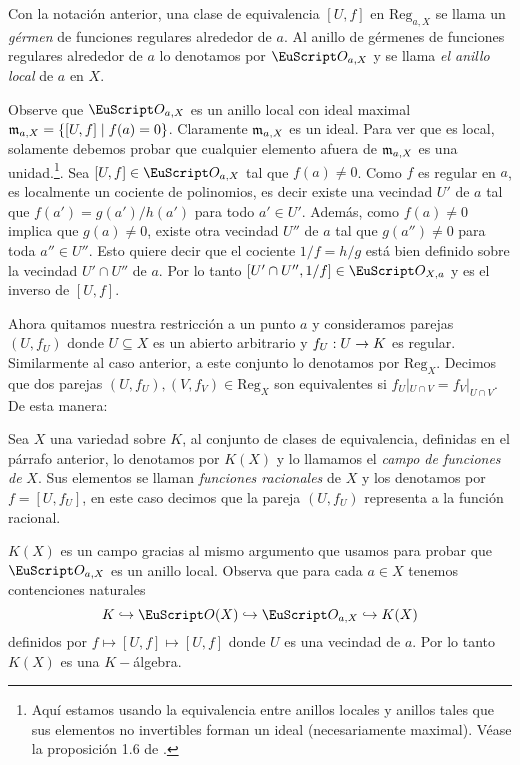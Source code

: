 \documentclass[../../tesis_maestria]{subfiles}
\begin{document}
\begin{defin}
Con la notación anterior, una clase de equivalencia $[U,f]$ en $\mathrm{Reg}_{a,X}$ se llama un \emph{gérmen} de funciones regulares alrededor de $a$. Al anillo de gérmenes de funciones regulares alrededor de $a$ lo denotamos por $\Oo_{a,X}$ y se llama \emph{el anillo local} de $a$ en $X$.
\end{defin}

\begin{nota}
Observe que $\Oo_{a,X}$ es un anillo local con ideal maximal $\mathfrak{m}_{a,X}=\{[U,f]\mid f(a)= 0\}$. Claramente $\mathfrak{m}_{a,X}$ es un ideal. Para ver que es local, solamente debemos probar que cualquier elemento afuera de $\mathfrak{m}_{a,X}$ es una unidad.\footnote{Aquí estamos usando la equivalencia entre anillos locales y anillos tales que sus elementos no invertibles forman un ideal (necesariamente maximal). Véase la proposición 1.6 de \cite{AtiyahITCA}.}. Sea $[U,f]\in\Oo_{a,X}$ tal que $f(a)\neq0$. Como $f$ es regular en $a$, es localmente un cociente de polinomios, es decir existe una vecindad $U'$ de $a$ tal que $f(a')=g(a')/h(a')$ para todo $a'\in U'$. Además, como $f(a)\neq 0$ implica que $g(a)\neq 0$, existe otra vecindad $U''$ de $a$ tal que $g(a'')\neq 0$ para toda $a''\in U''$. Esto quiere decir que el cociente $1/f=h/g$ está bien definido sobre la vecindad $U'\cap U''$ de $a$. Por lo tanto $[U'\cap U'',1/f]\in\Oo_{X,a}$ y es el inverso de $[U,f]$. 
\end{nota}

Ahora quitamos nuestra restricción a un punto $a$ y consideramos parejas $(U,f_U)$ donde $U\subseteq X$ es un abierto arbitrario y $f_U:U\rightarrow K$ es regular. Similarmente al caso anterior, a este conjunto lo denotamos por $\mathrm{Reg}_X$. Decimos que dos parejas $(U,f_U),(V,f_V)\in\mathrm{Reg}_X$ son equivalentes si $f_U|_{U\cap V}=f_V|_{U\cap V}$. De esta manera:

\begin{defin}
Sea $X$ una variedad sobre $K$, al conjunto de clases de equivalencia, definidas en el párrafo anterior, lo denotamos por $K(X)$ y lo llamamos el \emph{campo de funciones de} $X$. Sus elementos se llaman \emph{funciones racionales} de $X$ y los denotamos por $f=[U,f_U]$, en este caso decimos que la pareja $(U,f_U)$ representa a la función racional.
\end{defin}

\begin{nota}
$K(X)$ es un campo gracias al mismo argumento que usamos para probar que $\Oo_{a,X}$ es un anillo local. Observa que para cada $a\in X$ tenemos contenciones naturales
\[
	K\inc\Oo(X)\inc\Oo_{a,X}\inc K(X)
\]
definidos por $f\mapsto[U,f]\mapsto[U,f]$ donde $U$ es una vecindad de $a$. Por lo tanto $K(X)$ es una $K-$álgebra. 
\end{nota}
\end{document}
